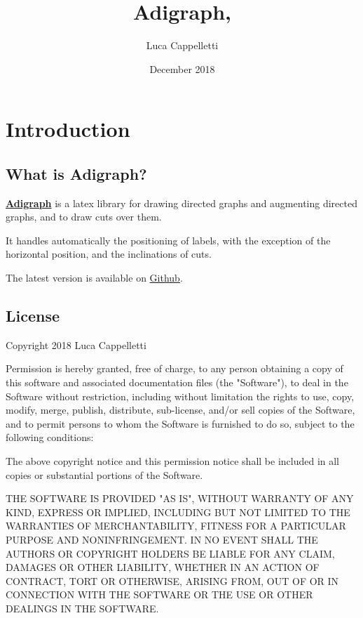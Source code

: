\documentclass{report}
\title{Adigraph, \AdigraphVersionNumber}
\author{Luca Cappelletti}
\date{December 2018}
\begin{document}
\maketitle

{\hypersetup{hidelinks}
	\tableofcontents  %
}

\chapter{Introduction}
\section{What is Adigraph?}
\textbf{\href{https://ctan.org/pkg/adigraph}{Adigraph}} is a latex library for drawing directed graphs and augmenting directed graphs, and to draw cuts over them.

It handles automatically the positioning of labels, with the exception of the horizontal position, and the inclinations of cuts.

The latest version is available on \href{https://github.com/LucaCappelletti94/adigraph}{Github}.

\section{License}
Copyright 2018 Luca Cappelletti

Permission is hereby granted, free of charge, to any person obtaining a copy of this software and associated documentation files (the "Software"), to deal in the Software without restriction, including without limitation the rights to use, copy, modify, merge, publish, distribute, sub-license, and/or sell copies of the Software, and to permit persons to whom the Software is furnished to do so, subject to the following conditions:

The above copyright notice and this permission notice shall be included in all copies or substantial portions of the Software.

THE SOFTWARE IS PROVIDED "AS IS", WITHOUT WARRANTY OF ANY KIND, EXPRESS OR IMPLIED, INCLUDING BUT NOT LIMITED TO THE WARRANTIES OF MERCHANTABILITY, FITNESS FOR A PARTICULAR PURPOSE AND NONINFRINGEMENT. IN NO EVENT SHALL THE AUTHORS OR COPYRIGHT HOLDERS BE LIABLE FOR ANY CLAIM, DAMAGES OR OTHER LIABILITY, WHETHER IN AN ACTION OF CONTRACT, TORT OR OTHERWISE, ARISING FROM, OUT OF OR IN CONNECTION WITH THE SOFTWARE OR THE USE OR OTHER DEALINGS IN THE SOFTWARE.\\
\end{document}
